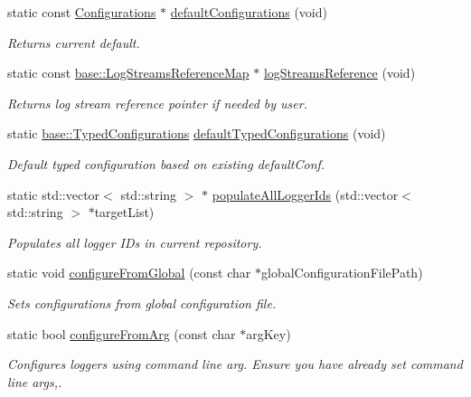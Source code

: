 \begin{DoxyCompactItemize}
static const \hyperlink{classel_1_1_configurations}{Configurations} $\ast$ \hyperlink{classel_1_1_loggers_a96f2336fafdc3ef2c4df01a73ae5ffb7}{default\+Configurations} (void)
\begin{DoxyCompactList}\small\item\em Returns current default. \end{DoxyCompactList}\item 
static const \hyperlink{namespaceel_1_1base_af7602da9fe1d6c75985184fb0e39fd11}{base\+::\+Log\+Streams\+Reference\+Map} $\ast$ \hyperlink{classel_1_1_loggers_ad17312c9474d94bc98efcaf08ca279a4}{log\+Streams\+Reference} (void)
\begin{DoxyCompactList}\small\item\em Returns log stream reference pointer if needed by user. \end{DoxyCompactList}\item 
static \hyperlink{classel_1_1base_1_1_typed_configurations}{base\+::\+Typed\+Configurations} \hyperlink{classel_1_1_loggers_af296007c3eb3b71602ec80ff59875b46}{default\+Typed\+Configurations} (void)
\begin{DoxyCompactList}\small\item\em Default typed configuration based on existing default\+Conf. \end{DoxyCompactList}\item 
static std\+::vector$<$ std\+::string $>$ $\ast$ \hyperlink{classel_1_1_loggers_adea07ec6cbc1dfc50f939d69dcac7160}{populate\+All\+Logger\+Ids} (std\+::vector$<$ std\+::string $>$ $\ast$target\+List)
\begin{DoxyCompactList}\small\item\em Populates all logger I\+Ds in current repository. \end{DoxyCompactList}\item 
static void \hyperlink{classel_1_1_loggers_a9992995a85745639aa9aa5a2df2255f5}{configure\+From\+Global} (const char $\ast$global\+Configuration\+File\+Path)
\begin{DoxyCompactList}\small\item\em Sets configurations from global configuration file. \end{DoxyCompactList}\item 
static bool \hyperlink{classel_1_1_loggers_a28acf6f2b1ea7e5edd1b2560cde82406}{configure\+From\+Arg} (const char $\ast$arg\+Key)
\begin{DoxyCompactList}\small\item\em Configures loggers using command line arg. Ensure you have already set command line args,. \end{DoxyCompactList}\item 

\end{DoxyCompactItemize}
